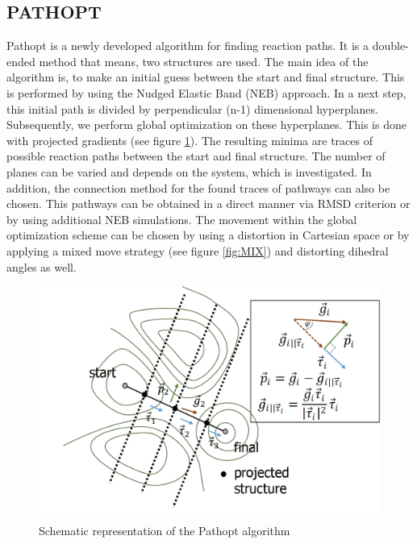 \documentclass[10pt,a4paper]{article} %
\begin{document}
\subsection{PATHOPT}	
Pathopt\supercite{Grebner2013b,Weber2016} is a newly developed algorithm for finding reaction paths. It is a double-ended method that means, two structures are used. The main idea of the algorithm is, to make an initial guess between the start and final structure. This is performed by using the Nudged Elastic Band (NEB) approach. In a next step, this initial path is divided by perpendicular (n-1) dimensional hyperplanes. Subsequently, we perform global optimization on these hyperplanes. This is done with projected gradients (see figure \ref{fig:MCM}). The resulting minima are traces of possible reaction paths between the start and final structure. The number of planes can be varied and depends on the system, which is investigated. In addition, the connection method for the found traces of pathways can also be chosen. This pathways can be obtained in a direct manner via RMSD criterion or by using additional NEB simulations. The movement within the global optimization scheme can be chosen by using a distortion in Cartesian space or by applying a mixed move strategy (see figure \ref{fig:MIX}) and distorting dihedral angles as well.\newline

\begin{figure}[h]
	\center
	\includegraphics[scale=0.4]{img/MCM_scheme_new.png}\caption{Schematic representation of the Pathopt algorithm}
	\label{fig:MCM}
\end{figure}
\end{document}
